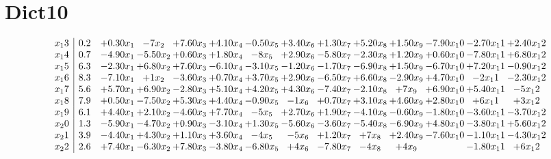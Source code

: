 \documentclass[12pt]{article}
\begin{document}
{\section{Dict10}
\[\begin{array}{c| c c@{\hskip 2pt} c@{\hskip 2pt} c@{\hskip 2pt} c@{\hskip 2pt} c@{\hskip 2pt} c@{\hskip 2pt} c@{\hskip 2pt} c@{\hskip 2pt} c@{\hskip 2pt} c@{\hskip 2pt} c@{\hskip 2pt} c@{\hskip 2pt} }
 x_13   &  0.2 & + 0.3  0 x_1 & -7 x_2 & + 7.6  0 x_3 & + 4.1  0 x_4 & -0.5  0 x_5 & + 3.4  0 x_6 & + 1.3  0 x_7 & + 5.2  0 x_8 & + 1.5  0 x_9 & -7.9  0 x_10 & -2.7  0 x_11 & + 2.4  0 x_12\\
 x_14   &  0.7 & -4.9  0 x_1 & -5.5  0 x_2 & + 0.6  0 x_3 & + 1.8  0 x_4 & -8 x_5 & + 2.9  0 x_6 & -5.8  0 x_7 & -2.3  0 x_8 & + 1.2  0 x_9 & + 0.6  0 x_10 & -7.8  0 x_11 & + 6.8  0 x_12\\
 x_15   &  6.3 & -2.3  0 x_1 & + 6.8  0 x_2 & + 7.6  0 x_3 & -6.1  0 x_4 & -3.1  0 x_5 & -1.2  0 x_6 & -1.7  0 x_7 & -6.9  0 x_8 & + 1.5  0 x_9 & -6.7  0 x_10 & + 7.2  0 x_11 & -0.9  0 x_12\\
 x_16   &  8.3 & -7.1  0 x_1 & + 1 x_2 & -3.6  0 x_3 & + 0.7  0 x_4 & + 3.7  0 x_5 & + 2.9  0 x_6 & -6.5  0 x_7 & + 6.6  0 x_8 & -2.9  0 x_9 & + 4.7  0 x_10 & -2 x_11 & -2.3  0 x_12\\
 x_17   &  5.6 & + 5.7  0 x_1 & + 6.9  0 x_2 & -2.8  0 x_3 & + 5.1  0 x_4 & + 4.2  0 x_5 & + 4.3  0 x_6 & -7.4  0 x_7 & -2.1  0 x_8 & + 7 x_9 & + 6.9  0 x_10 & + 5.4  0 x_11 & -5 x_12\\
 x_18   &  7.9 & + 0.5  0 x_1 & -7.5  0 x_2 & + 5.3  0 x_3 & + 4.4  0 x_4 & -0.9  0 x_5 & -1 x_6 & + 0.7  0 x_7 & + 3.1  0 x_8 & + 4.6  0 x_9 & + 2.8  0 x_10 & + 6 x_11 & + 3 x_12\\
 x_19   &  6.1 & + 4.4  0 x_1 & + 2.1  0 x_2 & -4.6  0 x_3 & + 7.7  0 x_4 & -5 x_5 & + 2.7  0 x_6 & + 1.9  0 x_7 & -4.1  0 x_8 & -0.6  0 x_9 & -1.8  0 x_10 & -3.6  0 x_11 & -3.7  0 x_12\\
 x_20   &  1.3 & -5.9  0 x_1 & -4.7  0 x_2 & + 0.9  0 x_3 & -3.1  0 x_4 & + 1.3  0 x_5 & -5.6  0 x_6 & -3.6  0 x_7 & -5.4  0 x_8 & -6.9  0 x_9 & + 4.8  0 x_10 & -3.8  0 x_11 & + 5.6  0 x_12\\
 x_21   &  3.9 & -4.4  0 x_1 & + 4.3  0 x_2 & + 1.1  0 x_3 & + 3.6  0 x_4 & -4 x_5 & -5 x_6 & + 1.2  0 x_7 & + 7 x_8 & + 2.4  0 x_9 & -7.6  0 x_10 & -1.1  0 x_11 & -4.3  0 x_12\\
 x_22   &  2.6 & + 7.4  0 x_1 & -6.3  0 x_2 & + 7.8  0 x_3 & -3.8  0 x_4 & -6.8  0 x_5 & + 4 x_6 & -7.8  0 x_7 & -4 x_8 & + 4 x_9 &   & -1.8  0 x_11 & + 6 x_12\\

\end{array}\]}
\end{document}
